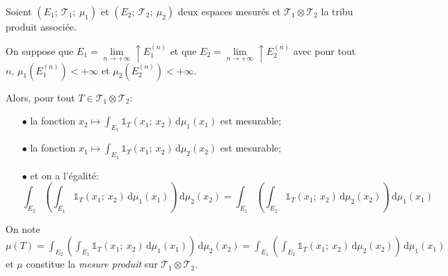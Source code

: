 \begin{theo}
Soient $(E_1;~\mathcal{T}_1;~\mu_1)$ et $(E_2;~\mathcal{T}_2;~\mu_2)$ deux espaces mesurés et $\mathcal{T}_1 \otimes \mathcal{T}_2$ la tribu produit associée.

On suppose que $E_1 = \lim \limits_{n \to +\infty} \uparrow E_1^{(n)}$ et que $E_2 = \lim \limits_{n \to +\infty} \uparrow E_2^{(n)}$ avec pour tout $n$, $\mu_1\left(E_1^{(n)}\right)<+\infty$ et $\mu_2\left(E_2^{(n)}\right)<+\infty$.

Alors, pour tout $T \in \mathcal{T}_1 \otimes \mathcal{T}_2$:
\begin{itemize}
\item[$\bullet$] la fonction $x_2 \mapsto \displaystyle{\int_{E_1}} \displaystyle{\mathbb{1}}_{T}(x_1;~x_2)  \,  \mathrm d \mu_1(x_1)$ est mesurable;
\item[$\bullet$] la fonction $x_1 \mapsto \displaystyle{\int_{E_2}} \displaystyle{\mathbb{1}}_{T}(x_1;~x_2)  \,  \mathrm d \mu_2(x_2)$ est mesurable;
\item[$\bullet$] et on a l'égalité:
\[
\displaystyle{\int_{E_2}} \left(\displaystyle{\int_{E_1}} \displaystyle{\mathbb{1}}_{T}(x_1;~x_2)  \, \mathrm d \mu_1(x_1)\right)  \, \mathrm d \mu_2(x_2) 
= \displaystyle{\int_{E_1}} \left(\displaystyle{\int_{E_2}} \displaystyle{\mathbb{1}}_{T}(x_1;~x_2)  \,  \mathrm d \mu_2(x_2)\right)  \,  \mathrm d \mu_1(x_1)
\]
\end{itemize}

On note $\mu(T) = \displaystyle{\int_{E_2}} \left(\displaystyle{\int_{E_1}} \displaystyle{\mathbb{1}}_{T}(x_1;~x_2)  \,  \mathrm d \mu_1(x_1)\right) \,  \mathrm d \mu_2(x_2) 
= \displaystyle{\int_{E_1}} \left(\displaystyle{\int_{E_2}} \displaystyle{\mathbb{1}}_{T}(x_1;~x_2)  \, \mathrm d \mu_2(x_2)\right)  \, \mathrm d \mu_1(x_1)$ et $\mu$ constitue la \emph{mesure produit} sur $\mathcal{T}_1 \otimes \mathcal{T}_2$.
\end{theo}

